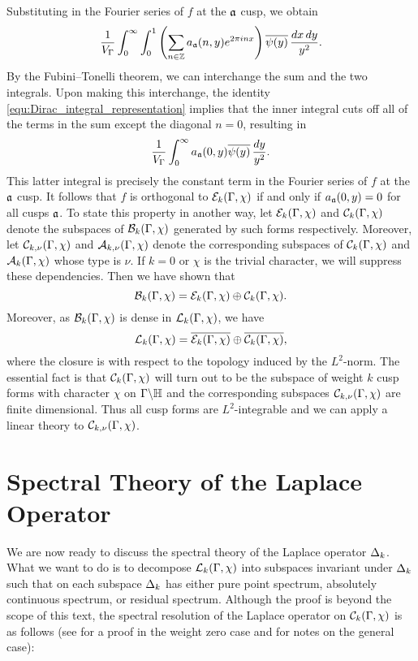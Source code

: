     Substituting in the Fourier series of $f$ at the $\mathfrak{a}$ cusp, we obtain
    \[
       \frac{1}{V_{\Gamma}}\int_{0}^{\infty}\int_{0}^{1}\left(\sum_{n \in \mathbb{Z}}a_{\mathfrak{a}}(n,y)e^{2\pi inx}\right)\overline{\psi(y)}\,\frac{dx\,dy}{y^{2}}.
    \]
    By the Fubini–Tonelli theorem, we can interchange the sum and the two integrals. Upon making this interchange, the identity \cref{equ:Dirac_integral_representation} implies that the inner integral cuts off all of the terms in the sum except the diagonal $n = 0$, resulting in
    \[
      \frac{1}{V_{\Gamma}}\int_{0}^{\infty}a_{\mathfrak{a}}(0,y)\overline{\psi(y)}\,\frac{dy}{y^{2}}.
    \]
    This latter integral is precisely the constant term in the Fourier series of $f$ at the $\mathfrak{a}$ cusp. It follows that $f$ is orthogonal to $\mathcal{E}_{k}(\Gamma,\chi)$ if and only if $a_{\mathfrak{a}}(0,y) = 0$ for all cusps $\mathfrak{a}$. To state this property in another way, let $\mathcal{E}_{k}(\Gamma,\chi)$ and $\mathcal{C}_{k}(\Gamma,\chi)$ denote the subspaces of $\mathcal{B}_{k}(\Gamma,\chi)$ generated by such forms respectively. Moreover, let $\mathcal{C}_{k,\nu}(\Gamma,\chi)$ and $\mathcal{A}_{k,\nu}(\Gamma,\chi)$ denote the corresponding subspaces of $\mathcal{C}_{k}(\Gamma,\chi)$ and $\mathcal{A}_{k}(\Gamma,\chi)$ whose type is $\nu$. If $k = 0$ or $\chi$ is the trivial character, we will suppress these dependencies. Then we have shown that
    \[
      \mathcal{B}_{k}(\Gamma,\chi) = \mathcal{E}_{k}(\Gamma,\chi) \oplus \mathcal{C}_{k}(\Gamma,\chi).
    \]
    Moreover, as $\mathcal{B}_{k}(\Gamma,\chi)$ is dense in $\mathcal{L}_{k}(\Gamma,\chi)$, we have
    \[
      \mathcal{L}_{k}(\Gamma,\chi) = \overline{\mathcal{E}_{k}(\Gamma,\chi)} \oplus \overline{\mathcal{C}_{k}(\Gamma,\chi)},
    \]
    where the closure is with respect to the topology induced by the $L^{2}$-norm. The essential fact is that $\mathcal{C}_{k}(\Gamma,\chi)$ will turn out to be the subspace of weight $k$ cusp forms with character $\chi$ on $\Gamma\backslash\mathbb{H}$ and the corresponding subspaces $\mathcal{C}_{k,\nu}(\Gamma,\chi)$ are finite dimensional. Thus all cusp forms are $L^{2}$-integrable and we can apply a linear theory to $\mathcal{C}_{k,\nu}(\Gamma,\chi)$.
  \section{Spectral Theory of the Laplace Operator}
    We are now ready to discuss the spectral theory of the Laplace operator $\Delta_{k}$. What we want to do is to decompose $\mathcal{L}_{k}(\Gamma,\chi)$ into subspaces invariant under $\Delta_{k}$ such that on each subspace $\Delta_{k}$ has either pure point spectrum, absolutely continuous spectrum, or residual spectrum. Although the proof is beyond the scope of this text, the spectral resolution of the Laplace operator on $\mathcal{C}_{k}(\Gamma,\chi)$ is as follows (see \cite{iwaniec2002spectral} for a proof in the weight zero case and \cite{duke2002subconvexity} for notes on the general case):

